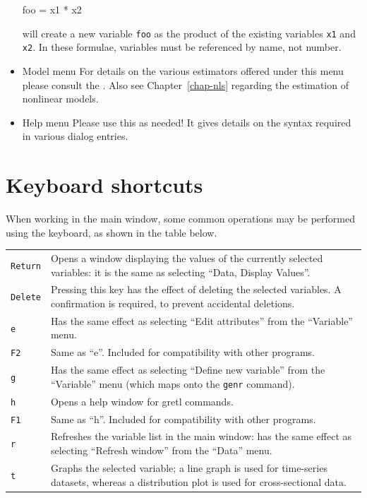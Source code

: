 \begin{itemize}
\begin{code} 
foo = x1 * x2
\end{code}

  will create a new variable \verb+foo+ as the product of the existing
  variables \verb+x1+ and \verb+x2+.  In these formulae, variables
  must be referenced by name, not number.

\item \textsf{Model menu} For details on the various estimators
  offered under this menu please consult the \GCR.  Also see
  Chapter~\ref{chap-nls} regarding the estimation of nonlinear models.

\item \textsf{Help menu} Please use this as needed! It gives details
  on the syntax required in various dialog entries.
\end{itemize}


\section{Keyboard shortcuts}
\label{keyb-accel}

When working in the main  window, some common operations
may be performed using the keyboard, as shown in the table below.

\begin{center}
\begin{tabular}{lp{5in}}
  \texttt{Return} & Opens a window displaying the values of the currently
  selected variables: it is the same as selecting ``Data, Display
  Values''. \\
  \texttt{Delete} & Pressing this key has the effect of deleting the
  selected variables. A confirmation is required, to prevent
  accidental deletions. \\
  \texttt{e} & Has the same effect as selecting ``Edit
  attributes'' from the ``Variable'' menu. \\
  \texttt{F2} & Same as ``e''. Included for compatibility with other
  programs.\\
  \texttt{g} & Has the same effect as selecting ``Define new
  variable'' from the ``Variable'' menu (which maps onto the
  \texttt{genr} command).\\
  \texttt{h} & Opens a help window for gretl commands.\\
  \texttt{F1} & Same as ``h''. Included for compatibility with other
  programs.\\
  \texttt{r} & Refreshes the variable list in the main window: has 
  the same effect as selecting ``Refresh window'' from the ``Data'' menu. \\
  \texttt{t} & Graphs the selected variable; a line graph is used for
  time-series datasets, whereas a distribution plot is used for
  cross-sectional data. 
\end{tabular}
\end{center}

